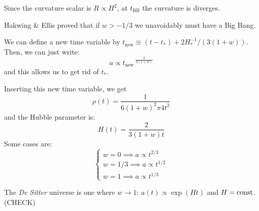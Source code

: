 \documentclass[main.tex]{subfiles}
\begin{document}
Since the curvature scalar is \(R \propto H^2\), at \(t_{\text{BB}}\)  the curvature is diverges.

Hakwing \& Ellis proved that if \(w>-1/3\) we unavoidably must have a Big Bang.

We can define a new time variable by \(t_{\text{new}} \equiv (t - t_{*}) + 2 H_*^{-1} / (3 (1+w))\). Then, we can just write:
\begin{equation}
  a \propto t_{\text{new}}\,^{\frac{2}{3(1+w)}}
\end{equation}
and this allows us to get rid of \(t_{*}\).

Inserting this new time variable, we get
\begin{equation}
  \rho(t) = \frac{1}{6 (1+w)^2 \pi 4 t^2}
\end{equation}
and the Hubble parameter is:
\begin{equation}
  H(t) = \frac{2}{3(1+w) t}
\end{equation}
Some cases are:
\begin{equation}
  \begin{cases}
      w = 0 \implies a \propto t^{2/3}  \\
      w=1/3 \implies a \propto t^{1/2} \\  
      w=1 \implies a \propto t^{1/3}  
  \end{cases}
\end{equation}

The \emph{De Sitter} universe is one where \(w \rightarrow 1\): \(a(t) \propto \exp(Ht) \) and \(H = \text{const}\). (CHECK) 
\end{document}
